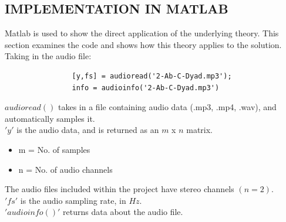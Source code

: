 \documentclass[12pt,a4paper]{article}
\begin{document}
	\subsection{IMPLEMENTATION IN MATLAB}
		Matlab is used to show the direct application of the underlying theory\cite{CodeTutorial}. This section examines the code and shows how this theory applies to the solution.\\
		Taking in the audio file\cite{AudioFiles}:
			\begin{lstlisting}
				[y,fs] = audioread('2-Ab-C-Dyad.mp3');
				info = audioinfo('2-Ab-C-Dyad.mp3')
			\end{lstlisting}
		$audioread()$ takes in a file containing audio data (.mp3, .mp4, .wav), and automatically samples it.\\
		$'y'$ is the audio data, and is returned as an $m$ x $n$ matrix.
		\begin{itemize}
			\item[] m = No. of samples
			\item[] n = No. of audio channels
		\end{itemize}
		The audio files included within the project have stereo channels $(n = 2)$.\\
		$'fs'$ is the audio sampling rate, in $Hz$.\\
		$'audioinfo()'$ returns data about the audio file.
\end{document}
